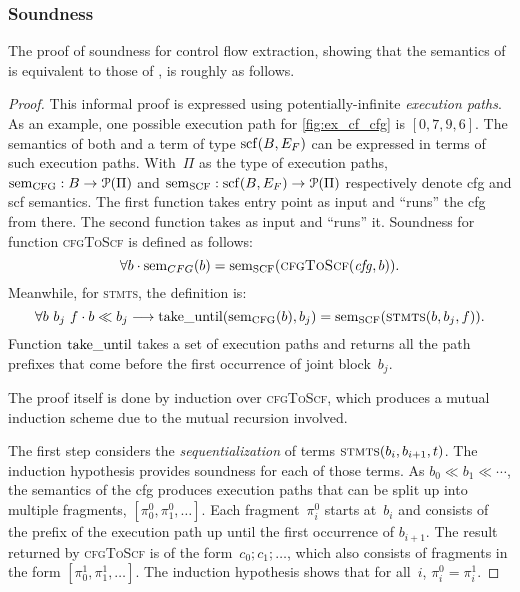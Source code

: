 \subsubsection{Soundness}
The proof of soundness for control flow extraction,
showing that the semantics%
of  is equivalent to those of ,
is roughly as follows.
\begin{proof}
  This informal proof is expressed using potentially-infinite \emph{execution paths}.%
  As an example, one possible execution path for \cref{fig:ex_cf_cfg}
  is $[0, 7, 9, 6]$.
  The semantics of both  and a term of type $\operatorname{scf}(B,E_F)$%
  can be expressed in terms of such execution paths.
  With~$\Pi$ as the type of execution paths,%
  $\operatorname{sem}_\mathrm{CFG}:B\rightarrow\operatorname{\mathcal{P}}(\Pi)$ and
  $\operatorname{sem}_\mathrm{SCF}:\operatorname{scf}(B,E_F)\rightarrow\operatorname{\mathcal{P}}(\Pi)$ respectively denote
  \ac{cfg} and \ac{scf} semantics.
  The first function takes  entry point as input
  and ``runs'' the \ac{cfg} from there.
  The second function takes  as input and ``runs'' it.
  Soundness for function \textsc{cfgToScf} is defined as follows:
  \begin{equation}
    \forall b\cdot\operatorname{sem}_{CFG}(b)=\operatorname{sem}_\mathrm{SCF}(\textsc{cfgToScf}(\mathit{cfg},b)).
  \end{equation}
    Meanwhile, for \textsc{stmts}, the definition is:
  \begin{equation}
    \forall b~b_j~f\cdot b\ll b_j\longrightarrow\operatorname{take\_until}(\operatorname{sem}_\mathrm{CFG}(b),b_j)
    =\operatorname{sem}_\mathrm{SCF}(\textsc{stmts}(b,b_j,f)).
  \end{equation}
  Function $\operatorname{take\_until}$ takes a set of execution paths
  and returns all the path prefixes
  that come before the first occurrence of joint block~$b_j$.

  The proof itself is done by induction over \textsc{cfgToScf},%
  which produces a mutual induction scheme due to the mutual recursion involved.
  
  The first step considers the \emph{sequentialization}
  of terms $\textsc{stmts}(b_i,b_{i+1},t)$.
  The induction hypothesis provides soundness for each of those terms.
  As $b_0\ll b_1\ll\dotsb$, the semantics of the \ac{cfg}%
  produces execution paths that can be split up into multiple fragments,
  $[\pi^0_0, \pi^0_1,\dotsc]$.
  Each fragment~$\pi^0_i$ starts at~$b_i$
  and consists of the prefix of the execution path
  up until the first occurrence of $b_{i+1}$.
  The result returned by \textsc{cfgToScf} is of the form~$c_0;c_1;\dotso$,
  which also consists of fragments in the form $[\pi^1_0,\pi^1_1,\dotsc]$.
  The induction hypothesis shows that for all~$i$, $\pi^0_i=\pi^1_i$.
  

\end{proof}
